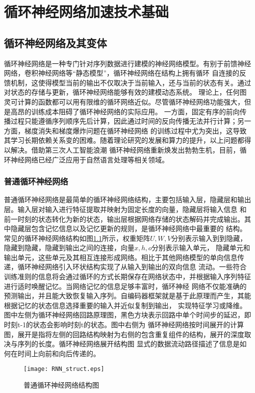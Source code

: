 \chapter{循环神经网络加速技术基础}

\section{循环神经网络及其变体}
循环神经网络是一种专门针对序列数据进行建模的神经网络模型。有别于前馈神经网络，卷积神经网络等“静态模型”，循环神经网络在结构上拥有循环
自连接的反馈机制，这使得模型当前的输出不仅取决于当前输入，还与当前的状态有关。通过对状态的存储与更新，循环神经网络能够有效的建模动态系统。
理论上，任何图灵可计算的函数都可以用有限维的循环网络近似。尽管循环神经网络功能强大，但是高昂的训练成本阻碍了循环神经网络的实际应用。
一方面，固定有序的前向传播过程只能遵循序列顺序先后计算，因此通过时间的反向传播无法并行计算；另一方面，梯度消失和梯度爆炸问题在循环神经网络
的训练过程中尤为突出，这导致其学习长期依赖关系变的困难。随着理论研究的发展和算力的提升，以上问题都得以解决。借助第三次人工智能浪潮
循环神经网络重新焕发出勃勃生机，目前，循环神经网络已经广泛应用于自然语言处理等相关领域。

\subsection{普通循环神经网络}
普通循环神经网络是最简单的循环神经网络结构，主要包括输入层，隐藏层和输出层。输入层对输入进行特征提取并映射为固定长度的向量，隐藏层将输入信息
和前一时刻的状态转化为新的状态，输出层根据网络存储的状态解码并完成输出。其中隐藏层包含记忆信息以及记忆更新的规则，是循环神经网络中最重要的
结构。
常见的循环神经网络结构如图\ref{fig:rnn}所示，权重矩阵\(U, W, V\)分别表示输入到到隐藏，隐藏到隐藏，隐藏到输出之间的连接，向量\(x, h, o\)分别表示输入单元，
隐藏单元和输出单元，这些单元及其相互连接形成网络。相比于其他网络模型的单向信息传递，循环神经网络引入环状结构实现了从输入到输出的双向信息
流动。一些符合训练准则的信息将会通过循环的方式长期保存在网络状态中，并根据输入序列特征进行适时唤醒记忆。当网络记忆的信息足够丰富时，循环神经
网络不仅能准确的预测输出，并且能大致恢复输入序列。自编码器框架就是基于此原理而产生，其能根据记忆的状态信息选择重要的输入并近似复制到输出，
实现特征学习或降维。图中左侧为循环神经网络回路原理图，黑色方块表示回路中单个时间步的延迟，即时刻t-1的状态会影响时刻t的状态。图中右侧为
循环神经网络按时间展开的计算图，展开是指将左侧的回路结构映射为右侧的包含重复组件的结构，展开的深度取决与序列的长度。循环神经网络展开结构图
显式的数据流动路径描述了信息是如何在时间上向前和向后传递的。
\begin{figure}
	\centering
	\texttt{[image: RNN\_struct.eps]}
	\caption{普通循环神经网络结构图}
	\label{fig:rnn}
\end{figure}

